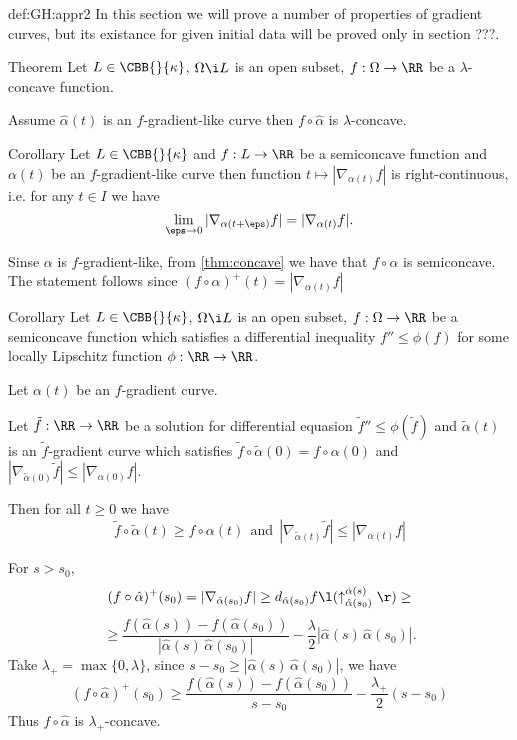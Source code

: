 {\begin{subthm}{def:GH:appr2}
In this section we will prove a number of properties of gradient curves, but its existance for given initial data will be proved only in section ???.

\begin{thm}{Theorem} \label{thm:concave}
Let $L\in\CBB{}{\kappa}$, 
$\Omega\i L$ is an open subset,
$f:\Omega\to \RR$ be a
$\lambda$-concave function. 

Assume $\hat\alpha(t)$ is an $f$-gradient-like curve then $f\circ\hat\alpha$ is $\lambda$-concave.
\end{thm} 


\begin{thm}{Corollary}
Let $L\in\CBB{}{\kappa}$ and $f:L\to \RR$ be a
semiconcave function and $\alpha(t)$ be an $f$-gradient-like curve then function
$t\mapsto |\nabla_{\alpha(t)}f|$
is right-continuous, i.e. for any $t\in I$ we have
$$\lim_{\eps\to0} |\nabla_{\alpha(t+\eps)}f|=|\nabla_{\alpha(t)}f|.$$
\end{thm}

Sinse $\alpha$ is $f$-gradient-like, from \ref{thm:concave} we have that $f\circ\alpha$ is semiconcave.
The statement follows since $(f\circ\alpha)^+(t)=|\nabla_{\alpha(t)}f|$
\qeds

\begin{thm}{Corollary}\label{thm:concave-comparison}
Let $L\in\CBB{}{\kappa}$, 
$\Omega\i L$ is an open subset,
$f:\Omega\to \RR$ be a
semiconcave function which satisfies a differential inequality
$f''\le\phi(f)$ for some locally Lipschitz function $\phi:\RR\to\RR$.

Let $\alpha(t)$ be an $f$-gradient curve.

Let $\tilde f:\RR\to\RR$ be a solution for differential equasion $\tilde f''\le\phi(\tilde f)$ and $\tilde \alpha(t)$ is an $\tilde f$-gradient curve which satisfies $\tilde f\circ\tilde \alpha(0)=f\circ\alpha(0)$ and $|\nabla_{\tilde \alpha(0)}\tilde f|\le |\nabla_{\alpha(0)}f|$.

Then for all $t\ge 0$ we have 
$$\tilde f\circ\tilde \alpha(t)\ge f\circ\alpha(t)\ \ \text{and}\ \ |\nabla_{\tilde \alpha(t)}\tilde f|\le |\nabla_{\alpha(t)}f|$$
\end{thm}



 For $s>s_0$,
$$(f\circ\hat\alpha)^+(s_0)=|\nabla_{\hat\alpha(s_0)}f|
\ge
d_{\hat\alpha(s_0)}f\l(\uparrow_{\hat\alpha(s_0)}^{\hat\alpha(s)}\r)
\ge$$
$$
\ge\frac{f(\hat\alpha(s))-f(\hat\alpha(s_0))
}{|\hat\alpha(s)\,\hat\alpha(s_0)|}
-
\frac\lambda2|\hat\alpha(s)\,\hat\alpha(s_0)|.$$
Take $\lambda_+=\max\{0,\lambda\}$, since $s-s_0\ge|\hat\alpha(s)\,\hat\alpha(s_0)|$, we
have 
$$(f\circ\hat\alpha)^+(s_0)\ge
\frac{f(\hat\alpha(s))-f(\hat\alpha(s_0))}{s-s_0}-\frac{\lambda_+}2(s-s_0)$$
Thus $f\circ\hat\alpha$ is $\lambda_+$-concave.


\end{subthm}}
